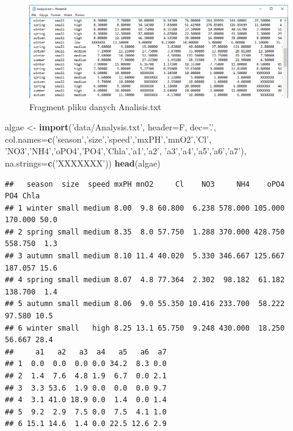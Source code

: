 \documentclass[]{book}
\newenvironment{Shaded}{\begin{snugshade}}{\end{snugshade}}
\newcommand{\DataTypeTok}[1]{\textcolor[rgb]{0.13,0.29,0.53}{#1}}
\newcommand{\KeywordTok}[1]{\textcolor[rgb]{0.13,0.29,0.53}{\textbf{#1}}}
\newcommand{\NormalTok}[1]{#1}
\newcommand{\StringTok}[1]{\textcolor[rgb]{0.31,0.60,0.02}{#1}}
\theoremstyle{plain}
\theoremstyle{definition}
\begin{document}
\begin{figure}
\includegraphics[width=10.67in]{images/analalysi_foto} \caption{Fragment pliku danych Analisis.txt}\label{fig:foto}
\end{figure}

\begin{Shaded}
\begin{Highlighting}[]
\NormalTok{algae <-}\StringTok{ }\KeywordTok{import}\NormalTok{(}\StringTok{'data/Analysis.txt'}\NormalTok{, }\DataTypeTok{header=}\NormalTok{F, }
                \DataTypeTok{dec=}\StringTok{'.'}\NormalTok{, }
                \DataTypeTok{col.names=}\KeywordTok{c}\NormalTok{(}\StringTok{'season'}\NormalTok{,}\StringTok{'size'}\NormalTok{,}\StringTok{'speed'}\NormalTok{,}\StringTok{'mxPH'}\NormalTok{,}\StringTok{'mnO2'}\NormalTok{,}\StringTok{'Cl'}\NormalTok{,}
                            \StringTok{'NO3'}\NormalTok{,}\StringTok{'NH4'}\NormalTok{,}\StringTok{'oPO4'}\NormalTok{,}\StringTok{'PO4'}\NormalTok{,}\StringTok{'Chla'}\NormalTok{,}\StringTok{'a1'}\NormalTok{,}\StringTok{'a2'}\NormalTok{,}
                            \StringTok{'a3'}\NormalTok{,}\StringTok{'a4'}\NormalTok{,}\StringTok{'a5'}\NormalTok{,}\StringTok{'a6'}\NormalTok{,}\StringTok{'a7'}\NormalTok{),}
                \DataTypeTok{na.strings=}\KeywordTok{c}\NormalTok{(}\StringTok{'XXXXXXX'}\NormalTok{))}
\KeywordTok{head}\NormalTok{(algae)}
\end{Highlighting}
\end{Shaded}

\begin{verbatim}
##   season  size  speed mxPH mnO2     Cl    NO3     NH4    oPO4     PO4 Chla
## 1 winter small medium 8.00  9.8 60.800  6.238 578.000 105.000 170.000 50.0
## 2 spring small medium 8.35  8.0 57.750  1.288 370.000 428.750 558.750  1.3
## 3 autumn small medium 8.10 11.4 40.020  5.330 346.667 125.667 187.057 15.6
## 4 spring small medium 8.07  4.8 77.364  2.302  98.182  61.182 138.700  1.4
## 5 autumn small medium 8.06  9.0 55.350 10.416 233.700  58.222  97.580 10.5
## 6 winter small   high 8.25 13.1 65.750  9.248 430.000  18.250  56.667 28.4
##     a1   a2   a3  a4   a5   a6  a7
## 1  0.0  0.0  0.0 0.0 34.2  8.3 0.0
## 2  1.4  7.6  4.8 1.9  6.7  0.0 2.1
## 3  3.3 53.6  1.9 0.0  0.0  0.0 9.7
## 4  3.1 41.0 18.9 0.0  1.4  0.0 1.4
## 5  9.2  2.9  7.5 0.0  7.5  4.1 1.0
## 6 15.1 14.6  1.4 0.0 22.5 12.6 2.9
\end{verbatim}
\end{document}
